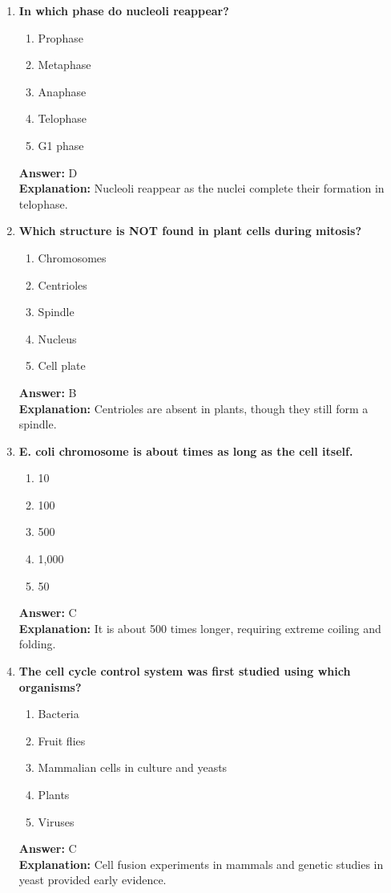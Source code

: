 \documentclass[11pt, a4paper]{article}
\begin{document}
\begin{enumerate}[leftmargin=*, label=\arabic*.]
\item \textbf{In which phase do nucleoli reappear?}
\begin{enumerate}[label=\Alph*.]
\item Prophase
\item Metaphase
\item Anaphase
\item Telophase
\item G1 phase
\end{enumerate}
\textbf{Answer:} D \\
\textbf{Explanation:} Nucleoli reappear as the nuclei complete their formation in telophase.

\item \textbf{Which structure is NOT found in plant cells during mitosis?}
\begin{enumerate}[label=\Alph*.]
\item Chromosomes
\item Centrioles
\item Spindle
\item Nucleus
\item Cell plate
\end{enumerate}
\textbf{Answer:} B \\
\textbf{Explanation:} Centrioles are absent in plants, though they still form a spindle.

\item \textbf{E. coli chromosome is about \underline{\hspace{1cm}} times as long as the cell itself.}
\begin{enumerate}[label=\Alph*.]
\item 10
\item 100
\item 500
\item 1,000
\item 50
\end{enumerate}
\textbf{Answer:} C \\
\textbf{Explanation:} It is about 500 times longer, requiring extreme coiling and folding.

\item \textbf{The cell cycle control system was first studied using which organisms?}
\begin{enumerate}[label=\Alph*.]
\item Bacteria
\item Fruit flies
\item Mammalian cells in culture and yeasts
\item Plants
\item Viruses
\end{enumerate}
\textbf{Answer:} C \\
\textbf{Explanation:} Cell fusion experiments in mammals and genetic studies in yeast provided early evidence.


\end{enumerate}
\end{document}
